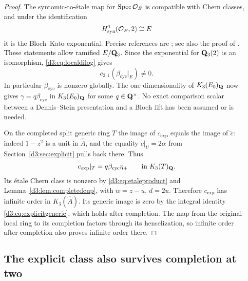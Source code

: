\begin{proof}
The syntomic-to-\'etale map for $\operatorname{Spec}\mathcal O_E$ is compatible with Chern classes, and under the identification
\[ H^1_{\mathrm{syn}}(\mathcal O_E,2)\cong E \]
it is the Bloch--Kato exponential. Precise references are \cite[Example~2.2.4 and Propositions~2.2.7, 2.2.9, 2.3.4]{HuberKings}; see also the proof of \cite[Corollary~5.19]{Tamme}. These statements allow ramified $E/\mathbf Q_3$. Since the exponential for $\mathbf Q_3(2)$ is an isomorphism, \eqref{d3:eq:localdilog} gives
\[
c_{2,1}(\beta_{\mathrm{cyc}}|_E)\ne0.
\]
In particular $\beta_{\mathrm{cyc}}$ is nonzero globally. The one-dimensionality of $K_3(E_0)_{\mathbf Q}$ now gives $\gamma=q\beta_{\mathrm{cyc}}$ in $K_3(E_0)_{\mathbf Q}$ for some $q\in\mathbf Q^\times$. No exact comparison scalar between a Dennis--Stein presentation and a Bloch lift has been assumed or is needed.

On the completed split generic ring $T$ the image of $c_{\mathrm{exp}}$ equals the image of $\widetilde c$: indeed $1-z^2$ is a unit in $\widehat A$, and the equality $\widetilde c|_U=2\alpha$ from Section~\ref{d3:sec:explicit} pulls back there. Thus
\[
c_{\mathrm{exp}}|_T=q\beta_{\mathrm{cyc}}\eta_+\qquad\text{in }K_3(T)_{\mathbf Q}.
\]
Its \'etale Chern class is nonzero by \eqref{d3:eq:etaleproduct} and Lemma~\ref{d3:lem:completedcup}, with $w=z-u$, $d=2u$. Therefore $c_{\mathrm{exp}}$ has infinite order in $K_3(\widehat A)$. Its generic image is zero by the integral identity \eqref{d3:eq:explicitgeneric}, which holds after completion. The map from the original local ring to its completion factors through its henselization, so infinite order after completion also proves infinite order there.
\end{proof}

\subsection{The explicit class also survives completion at two}
\label{d3:sec:explicittwocomplete}

